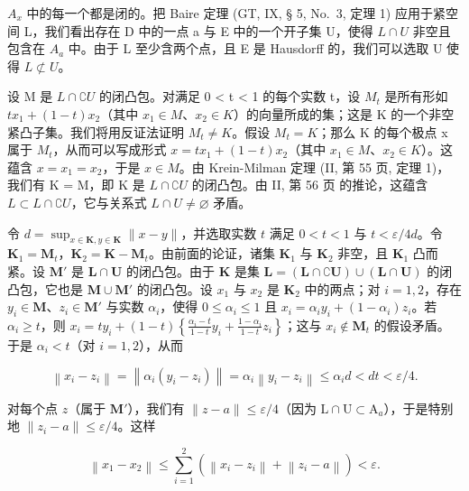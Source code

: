 \(A_{x}\) 中的每一个都是闭的。把 Baire 定理 (GT, IX, § 5, No.~3, 定理 1) 应用于紧空间 L，我们看出存在 D 中的一点 a 与 E 中的一个开子集 U，使得 \(L \cap U\) 非空且包含在 \(A_{a}\) 中。由于 L 至少含两个点，且 E 是 Hausdorff 的，我们可以选取 U 使得 \(L \not\subset U\)。

设 M 是 \(L \cap \complement U\) 的闭凸包。对满足 0 \textless{} t \textless{} 1 的每个实数 t，设 \(M_{t}\) 是所有形如 \(tx_{1} + (1 - t)x_{2}\)（其中 \(x_{1} \in M\)、\(x_{2} \in K\)）的向量所成的集；这是 K 的一个非空紧凸子集。我们将用反证法证明 \(M_{t} \neq K\)。假设 \(M_{t} = K\)；那么 K 的每个极点 x 属于 \(M_{t}\)，从而可以写成形式 \(x = tx_{1} + (1 - t)x_{2}\)（其中 \(x_{1} \in M\)、\(x_{2} \in K\)）。这蕴含 \(x = x_{1} = x_{2}\)，于是 \(x \in M\)。由 Krein-Milman 定理 (II, 第 55 页, 定理 1)，我们有 K = M，即 K 是 \(L \cap \complement U\) 的闭凸包。由 II, 第 56 页 的推论，这蕴含 \(L \subset L \cap \complement U\)，它与关系式 \(L \cap U \neq \varnothing\) 矛盾。

令 \(d = \sup_{x \in \mathbf{K}, y \in \mathbf{K}} \| x - y \|\)，并选取实数 \(t\) 满足 \(0 < t < 1\) 与 \(t < \varepsilon / 4d\)。令 \(\mathbf{K}_1 = \mathbf{M}_t\)，\(\mathbf{K}_2 = \mathbf{K} - \mathbf{M}_t\)。由前面的论证，诸集 \(\mathbf{K}_1\) 与 \(\mathbf{K}_2\) 非空，且 \(\mathbf{K}_1\) 凸而紧。设 \(\mathbf{M}'\) 是 \(\mathbf{L} \cap \mathbf{U}\) 的闭凸包。由于 \(\mathbf{K}\) 是集 \(\mathbf{L} = (\mathbf{L} \cap \complement \mathbf{U}) \cup (\mathbf{L} \cap \mathbf{U})\) 的闭凸包，它也是 \(\mathbf{M} \cup \mathbf{M}'\) 的闭凸包。设 \(x_1\) 与 \(x_2\) 是 \(\mathbf{K}_2\) 中的两点；对 \(i = 1, 2\)，存在 \(y_i \in \mathbf{M}\)、\(z_i \in \mathbf{M}'\) 与实数 \(\alpha_i\)，使得 \(0 \leqslant \alpha_i \leqslant 1\) 且 \(x_i = \alpha_i y_i + (1 - \alpha_i) z_i\)。若 \(\alpha_i \geqslant t\)，则 \(x_i = ty_i + (1 - t) \left\{\frac{\alpha_i - t}{1 - t} y_i + \frac{1 - \alpha_i}{1 - t} z_i\right\}\)；这与 \(x_i \notin \mathbf{M}_t\) 的假设矛盾。于是 \(\alpha_i < t\)（对 \(i = 1, 2\)），从而

\[
\left\| x _ {i} - z _ {i} \right\| = \left\| \alpha_ {i} \left(y _ {i} - z _ {i}\right) \right\| = \alpha_ {i} \left\| y _ {i} - z _ {i} \right\| \leqslant \alpha_ {i} d <   d t <   \varepsilon / 4.
\]

对每个点 \(z\)（属于 \(\mathbf{M}'\)），我们有 \(\| z - a \| \leqslant \varepsilon / 4\)（因为 \(\mathrm{L} \cap \mathrm{U} \subset \mathrm{A}_a\)），于是特别地 \(\| z_i - a \| \leqslant \varepsilon / 4\)。这样

\[
\left\| x _ {1} - x _ {2} \right\| \leqslant \sum_ {i = 1} ^ {2} \left(\left\| x _ {i} - z _ {i} \right\| + \left\| z _ {i} - a \right\|\right) <   \varepsilon .
\]

